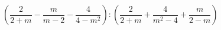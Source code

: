 \begin{ex}[type=expression]
	\begin{condition}
		 \( \left( \dfrac{2}{2+m}-\dfrac{m}{m-2}-\dfrac{4}{4-m^2} \right) :\left( \dfrac{2}{2+m}+\dfrac{4}{m^2-4}+\dfrac{m}{2-m} \right)\)
	\end{condition}
\end{ex}